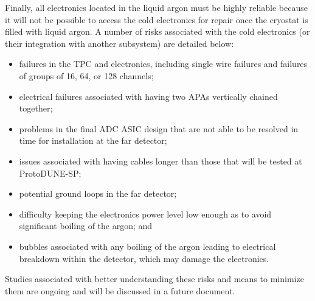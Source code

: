 Finally, all electronics located in the liquid argon must be highly reliable because it will not be possible to access the cold electronics for repair once the cryostat is filled with liquid argon.  A number of risks associated with the cold electronics (or their integration with another subsystem) are detailed below:

\begin{itemize}
\item{failures in the TPC and electronics, including single wire failures and failures of groups of 16, 64, or 128 channels;}
\item{electrical failures associated with having two APAs vertically chained together;}
\item{problems in the final ADC ASIC design that are not able to be resolved in time for installation at the far detector;}
\item{issues associated with having cables longer than those that will be tested at ProtoDUNE-SP;}
\item{potential ground loops in the far detector;}
\item{difficulty keeping the electronics power level low enough as to avoid significant boiling of the argon; and}
\item{bubbles associated with any boiling of the argon leading to electrical breakdown within the detector, which may damage the electronics.}
\end{itemize}

Studies associated with better understanding these risks and means to minimize them are ongoing and will be discussed in a future document.


